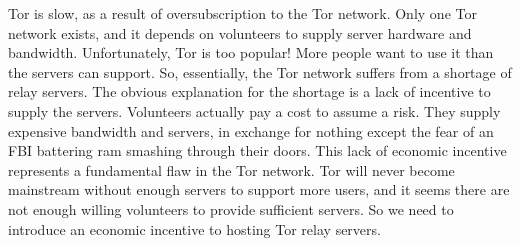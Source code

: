 Tor is slow, as a result of oversubscription to the Tor network. Only one Tor network exists, and it depends on volunteers to supply server hardware and bandwidth. Unfortunately, Tor is too popular! More people want to use it than the servers can support. So, essentially, the Tor network suffers from a shortage of relay servers. The obvious explanation for the shortage is a lack of incentive to supply the servers. Volunteers actually pay a cost to assume a risk. They supply expensive bandwidth and servers, in exchange for nothing except the fear of an FBI battering ram smashing through their doors. This lack of economic incentive represents a fundamental flaw in the Tor network. Tor will never become mainstream without enough servers to support more users, and it seems there are not enough willing volunteers to provide sufficient servers. So we need to introduce an economic incentive to hosting Tor relay servers.
